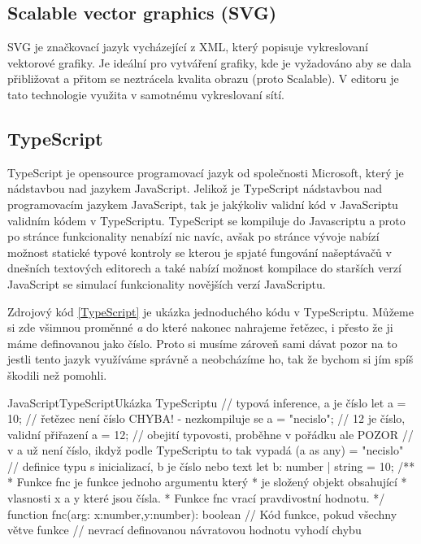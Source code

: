 \documentclass[
  biblatex,
  glossaries,
]{kidiplom}
\begin{document}
\subsection{Scalable vector graphics (SVG)}
SVG je značkovací jazyk vycházející z XML, který popisuje vykreslovaní 
vektorové grafiky. Je ideální pro vytváření grafiky, kde je vyžadováno
aby se dala přibližovat a přitom se neztrácela kvalita obrazu (proto Scalable).
V editoru je tato technologie využita v samotnému vykreslovaní sítí.


\clearpage
\subsection{TypeScript}
TypeScript je opensource programovací jazyk od společnosti Microsoft, který je nádstavbou nad jazykem JavaScript.
Jelikož je TypeScript nádstavbou nad programovacím jazykem JavaScript, tak je jakýkoliv validní kód v JavaScriptu validním kódem v TypeScriptu.
TypeScript se kompiluje do Javascriptu a proto po stránce 
funkcionality nenabízí nic navíc, avšak po stránce vývoje 
nabízí možnost statické typové kontroly
se kterou je spjaté fungování našeptávačů v dnešních textových 
editorech a také nabízí možnost kompilace do 
starších verzí JavaScript se simulací funkcionality 
novějších verzí JavaScriptu.

Zdrojový kód \ref{TypeScript} je ukázka jednoduchého kódu v TypeScriptu. Můžeme
si zde všimnou proměnné \textit{a} do které nakonec nahrajeme 
řetězec, i přesto že 
ji máme definovanou jako číslo. Proto si musíme zároveň sami dávat pozor na to jestli
tento jazyk využíváme správně a neobcházíme ho, tak že bychom si jím spíš škodili než pomohli.
\begin{kicode}{JavaScript}{TypeScript}{Ukázka TypeScriptu}
  // typová inference, a je číslo
  let a = 10;
  // řetězec není číslo CHYBA! - nezkompiluje se
  a = "necislo";
  // 12 je číslo, validní přiřazení
  a = 12; 
  // obejití typovosti, proběhne v pořádku ale POZOR 
  // v a už není číslo, ikdyž podle TypeScriptu to tak vypadá
  (a as any) = "necislo"
  // definice typu s inicializací, b je číslo nebo text
  let b: number | string = 10;
  /**
   * Funkce fnc je funkce jednoho argumentu který 
   * je složený objekt obsahující
   * vlasnosti x a y které jsou čísla.
   * Funkce fnc vrací pravdivostní hodnotu.
   */
  function fnc(arg: {x:number,y:number}): boolean {
      // Kód funkce, pokud všechny větve funkce 
      // nevrací definovanou návratovou hodnotu vyhodí chybu
  }

\end{kicode}
\end{document}
